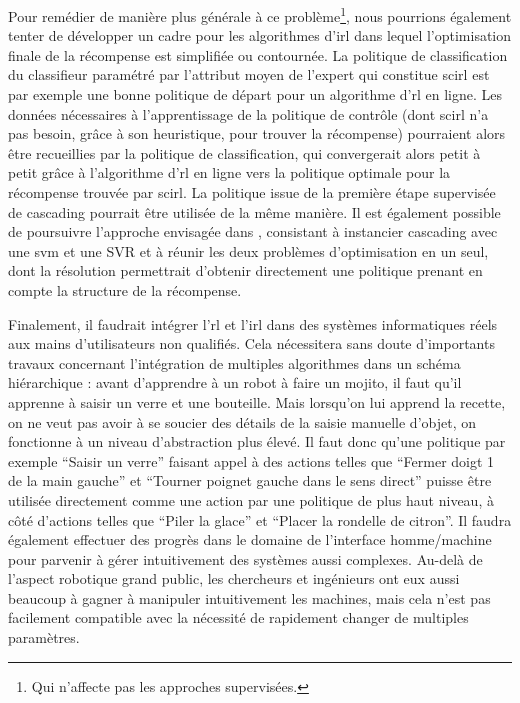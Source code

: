 \documentclass[frenchb,a4paper,justified,notoc]{tufte-book}
\begin{document}
Pour remédier de manière plus générale à ce problème\footnote{Qui n'affecte pas les approches supervisées.
 }, nous pourrions également tenter de développer un cadre pour les algorithmes d'\gls{irl} dans lequel l'optimisation finale de la récompense est simplifiée ou contournée. La politique de classification du classifieur paramétré par l'attribut moyen de l'expert qui constitue \gls{scirl} est par exemple une bonne politique de départ pour un algorithme d'\gls{rl} en ligne. Les données nécessaires à l'apprentissage de la politique de contrôle (dont \gls{scirl} n'a pas besoin, grâce à son heuristique, pour trouver la récompense) pourraient alors être recueillies par la politique de classification, qui convergerait alors petit à petit grâce à l'algorithme d'\gls{rl} en ligne vers la politique optimale pour la récompense trouvée par \gls{scirl}. La politique issue de la première étape supervisée de \gls{cascading} pourrait être utilisée de la même manière. Il est également possible de poursuivre l'approche envisagée dans \citep{geist2013cascading}, consistant à instancier \gls{cascading} avec une \gls{svm} et une SVR et à réunir les deux problèmes d'optimisation en un seul, dont la résolution permettrait d'obtenir directement une politique prenant en compte la structure de la récompense.

Finalement, il faudrait intégrer l'\gls{rl} et l'\gls{irl} dans des systèmes informatiques réels aux mains d'utilisateurs non qualifiés. Cela nécessitera sans doute d'importants travaux concernant l'intégration de multiples algorithmes dans un schéma hiérarchique : avant d'apprendre à un robot à faire un mojito, il faut qu'il apprenne à saisir un verre et une bouteille. Mais lorsqu'on lui apprend la recette, on ne veut pas avoir à se soucier des détails de la saisie manuelle d'objet, on fonctionne à un niveau d'abstraction plus élevé. Il faut donc qu'une politique par exemple ``Saisir un verre'' faisant appel à des actions telles que ``Fermer doigt 1 de la main gauche'' et ``Tourner poignet gauche dans le sens direct'' puisse être utilisée directement comme une action par une politique de plus haut niveau, à côté d'actions telles que ``Piler la glace'' et ``Placer la rondelle de citron''. Il faudra également effectuer des progrès dans le domaine de l'interface homme/machine pour parvenir à gérer intuitivement des systèmes aussi complexes. Au-delà de l'aspect robotique grand public, les chercheurs et ingénieurs ont eux aussi beaucoup à gagner à manipuler intuitivement les machines, mais cela n'est pas facilement compatible avec la nécessité de rapidement changer de multiples paramètres.
 
\end{document}
